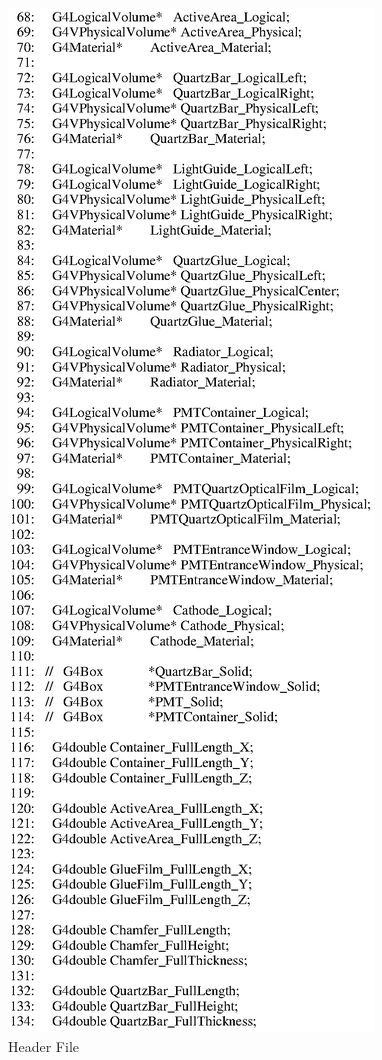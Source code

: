 \begin{figure}[ht]
  \hspace{0cm}
  \includegraphics[scale=0.8]{./figures5/QweakSimCerenkovDetector.hh-p2.eps}
  \caption{Header File}
           \label{fig:V-SC-2}
\end{figure}
\clearpage

